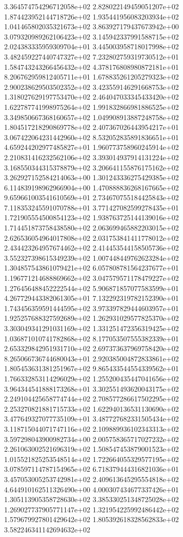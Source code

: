 3.364574754296712058e+02 2.828022149459051207e+02 1.874423952144718726e+02
1.935441956083203934e+02 1.041465802035321673e+02 3.863927179437673942e+00
3.079320989262106423e+02 3.145942337991588715e+02 2.024383335959309704e+01
3.445003958718017998e+02 3.482459227440747327e+02 7.232802759319730512e+01
1.584743243266456432e+02 4.378176808980872181e+01 8.206762959812405711e+01
1.678835261205279323e+02 2.900238629503502352e+02 3.423559146291668753e+02
1.318027629197753470e+02 2.464047033345433420e+02 1.622787741998975264e+02
1.991832866981886525e+02 3.349850667368160657e+02 1.049908913887248758e+02
1.804517218290869778e+02 2.407367026443954217e+01 3.067422064231442960e+02
8.532052835891836651e+01 4.659244202977485827e+01 1.960773758960245914e+02
2.210831416232562106e+02 3.393014937914131224e+02 3.168550344315378879e+02
3.206641155876175162e+02 3.262927152584214063e+00 1.301243336275429385e+02
6.114839198962966904e+00 1.470888836268167665e+02 9.659661003541610569e+01
2.734670755184425843e+02 7.118353245591070788e+01 3.771427082599278435e+01
1.721905554500854123e+02 1.938763725144139016e+02 1.714451873758438580e+02
2.063699465882203015e+02 2.626536054964017808e+02 2.031753841411778012e+02
2.434423264957674462e+02 2.414453544158505736e+02 3.552327398615349239e+02
1.007448449762623284e+02 1.304857543861079421e+02 6.057808781564237677e+01
1.196771214688869662e+02 3.047579571178479227e+02 1.276456488452222544e+02
5.906871857077583599e+01 4.267729443382061305e+01 7.132292319782152390e+01
1.743456359591444595e+02 3.973397829444603957e+01 1.925257688327592689e+02
1.262931029577825370e+02 3.303049341291031169e+02 1.331251472356319425e+02
1.036871010741782868e+02 8.177053507555382339e+01 2.653329842951931710e+02
2.697373637969758420e+02 8.265066736744680043e+01 2.920385004872833861e+02
1.805453631381251967e+02 9.865433544554339562e+01 1.766332853114296029e+02
1.255200435447041656e+02 3.964344541888173268e+01 3.302551493620043175e+02
2.249104425658774744e+02 2.708577286617502295e+02 2.253270821881715733e+02
1.622940136531130690e+02 3.477649327077735109e+01 3.487727682331505434e+02
3.118715044071747116e+02 2.109889936102343313e+02 3.597298043900982734e+00
2.005758365717027232e+02 2.261063002521696319e+02 1.508547453879001523e+02
1.015521825253548514e+02 1.722664055329577195e+02 3.078597114787154965e+02
6.718379444316821036e+01 3.457053005253742981e+02 2.409613645295554818e+02
4.644910162511326490e+00 4.000307434677337426e+01 1.305113905358728630e+02
3.385330251348725028e+02 1.269027737905771147e+02 1.321954225992486442e+02
1.579679927801429642e+02 1.805392618328562833e+02 3.582246341142694632e+02
